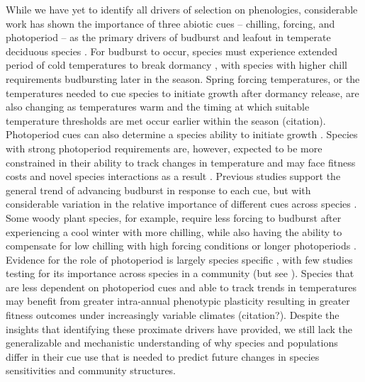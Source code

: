 \documentclass{article}\usepackage[]{graphicx}\usepackage[]{color}
\begin{document}
While we have yet to identify all drivers of selection on phenologies, considerable work has shown the importance of three abiotic cues -- chilling, forcing, and photoperiod -- as the primary drivers of budburst and leafout in temperate deciduous species \citep{Basler2014,Chuine2016, Harrington2016,Flynn2018}. For budburst to occur, species must experience extended period of cold temperatures to break dormancy \citep{Cooke2012}, with species with higher chill requirements budbursting later in the season. Spring forcing temperatures, or the temperatures needed to cue species to initiate growth after dormancy release, are also changing as temperatures warm and the timing at which suitable temperature thresholds are met occur earlier within the season (citation). Photoperiod cues can also determine a species ability to initiate growth \citep{Basler2014,Zohner2020}. Species with strong photoperiod requirements are, however, expected to be more constrained in their ability to track changes in temperature and may face fitness costs and novel species interactions as a result \citep{Guy2014, others?}. Previous studies support the general trend of advancing budburst in response to each cue, but with considerable variation in the relative importance of different cues across species \citep{Chuine2016,Flynn2018}. Some woody plant species, for example, require less forcing to budburst after experiencing a cool winter with more chilling, while also having the ability to compensate for low chilling with high forcing conditions or longer photoperiods \citep{Laube2014,Harrington2015,Flynn2018,Caffarra2011,Basler2014,Zohner2016}. Evidence for the role of photoperiod is largely species specific  \citep{Heide1993, Basler2014, Singh2017, Zohner2016}, with few studies testing for its importance across species in a community (but see  \cite{Flynn2018}). Species that are less dependent on photoperiod cues and able to track trends in temperatures may benefit from greater intra-annual phenotypic plasticity resulting in greater fitness outcomes under increasingly variable climates (citation?). Despite the insights that identifying these proximate drivers have provided, we still lack the generalizable and mechanistic understanding of why species and populations differ in their cue use that is needed to predict future changes in species sensitivities and community structures.\\
\end{document}
